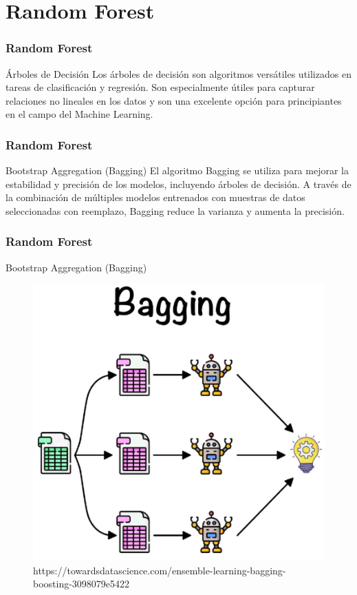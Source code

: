 \documentclass{beamer}
\begin{document}
\section{Random Forest}

\begin{frame}
    \frametitle{Random Forest}
\begin{block}{Árboles de Decisión}
      Los árboles de decisión son algoritmos versátiles utilizados en tareas de clasificación y regresión. Son especialmente útiles para capturar relaciones no lineales en los datos y son una excelente opción para principiantes en el campo del Machine Learning.
\end{block}
\end{frame}


\begin{frame}
\frametitle{Random Forest}
  \begin{block}{Bootstrap Aggregation (Bagging)}
      El algoritmo Bagging se utiliza para mejorar la estabilidad y precisión de los modelos, incluyendo árboles de decisión. A través de la combinación de múltiples modelos entrenados con muestras de datos seleccionadas con reemplazo, Bagging reduce la varianza y aumenta la precisión.
  \end{block} 
\end{frame}


\begin{frame}
	\frametitle{Random Forest}
	\begin{block}{Bootstrap Aggregation (Bagging)}
		\begin{figure}
			\includegraphics[scale=0.25]{bagging.png}
			\caption{https://towardsdatascience.com/ensemble-learning-bagging-boosting-3098079e5422}
		\end{figure}
	\end{block}
\end{frame}
\end{document}
